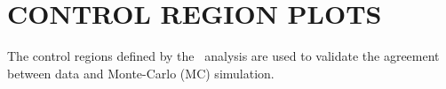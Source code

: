\chapter{CONTROL REGION PLOTS}
\label{appendixB}

The control regions defined by the \VHbb\ analysis are used to validate the agreement between data and Monte-Carlo (MC) simulation.

\begin{figure}[htbp]
  \centering
  \mbox{
  }
  \mbox{
}
\end{figure}
